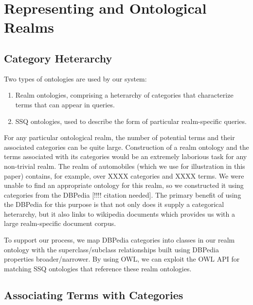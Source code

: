 \section{Representing and Ontological Realms}
\subsection{Category Heterarchy} 
Two types of ontologies are used by our system:
\begin{enumerate}
\item Realm ontologies, comprising a heterarchy of categories that
  characterize terms that can appear in queries.
\item SSQ ontologies, used to describe the form of particular
  realm-specific queries.
\end{enumerate}
For any particular ontological realm, the number of potential
terms and their associated categories can be quite large.
Construction of a realm ontology and the terms associated
with its categories would be an extremely laborious task
for any non-trivial realm. The realm of automobiles (which
we use for illustration in this paper) contains, for example,
over XXXX categories and XXXX terms. We were unable to find
an appropriate ontology for this realm, so we constructed it
using categories from the DBPedia [!!!! citation needed].
The primary benefit of using the DBPedia for this purpose is
that not only does it supply a categorical heterarchy, but it
also links to wikipedia documents which provides us with a large
realm-specific document corpus.

To support our process, we map DBPedia categories into classes in our
realm ontology with the superclass/subclass relationships built using
DBPedia properties broader/narrower.  By using OWL, we can exploit the
OWL API for matching SSQ ontologies that reference these realm
ontologies.





\subsection{Associating Terms with Categories}


